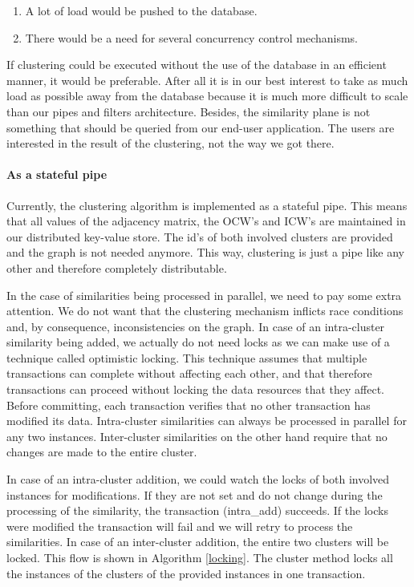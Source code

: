 \begin{enumerate}
\item A lot of load would be pushed to the database.
\item There would be a need for several concurrency control mechanisms.
\end{enumerate}

If clustering could be executed without the use of the database in an efficient manner, it would be preferable. After all it is in our best interest to take as much load as possible away from the database because it is much more difficult to scale than our pipes and filters architecture. Besides, the similarity plane is not something that should be queried from our end-user application. The users are interested in the result of the clustering, not the way we got there.

\paragraph{As a stateful pipe}

Currently, the clustering algorithm is implemented as a stateful pipe. This means that all values of the adjacency matrix, the OCW's and ICW's  are maintained in our distributed key-value store. The id's of both involved clusters are provided and the graph is not needed anymore. This way, clustering is just a pipe like any other and therefore completely distributable.

In the case of similarities being processed in parallel, we need to pay some extra attention. We do not want that the clustering mechanism inflicts race conditions and, by consequence, inconsistencies on the graph. In case of an intra-cluster similarity being added, we actually do not need locks as we can make use of a technique called optimistic locking. This technique assumes that multiple transactions can complete without affecting each other, and that therefore transactions can proceed without locking the data resources that they affect. Before committing, each transaction verifies that no other transaction has modified its data. Intra-cluster similarities can always be processed in parallel for any two instances. Inter-cluster similarities on the other hand require that no changes are made to the entire cluster.

In case of an intra-cluster addition, we could watch the locks of both involved instances for modifications. If they are not set and do not change during the processing of the similarity, the transaction (intra\_add) succeeds. If the locks were modified the transaction will fail and we will retry to process the similarities. In case of an inter-cluster addition, the entire two clusters will be locked. This flow is shown in Algorithm \autoref{locking}. The cluster method locks all the instances of the clusters of the provided instances in one transaction.

